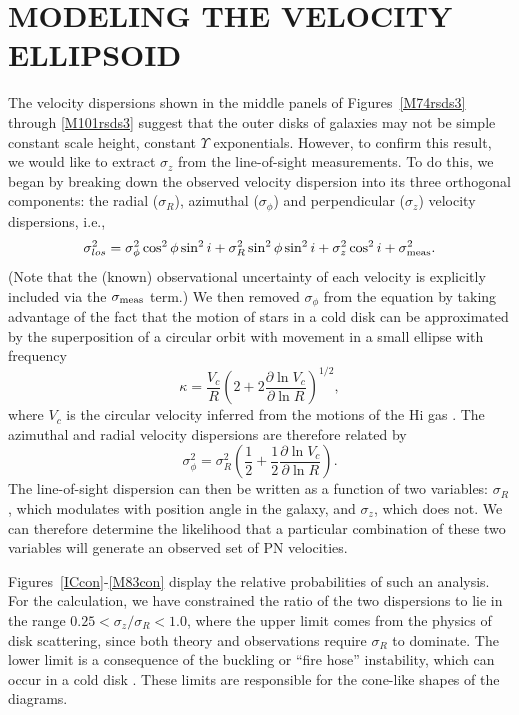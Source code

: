 \documentclass[12pt,preprint]{emulateapj}
\newcommand{\ie}{{i.e.,}}
\begin{document}
\section{MODELING THE VELOCITY ELLIPSOID}

The velocity dispersions shown in the middle panels of Figures~\ref{M74rsds3} through \ref{M101rsds3} suggest that the outer disks of galaxies may not be simple constant scale height, constant $\Upsilon$ exponentials.  However, to confirm this result, we would like to extract $\sigma_z$ from the line-of-sight measurements.  To do this, we began by breaking down the observed velocity dispersion into its three orthogonal components: the radial ($\sigma_R$), azimuthal ($\sigma_{\phi}$) and perpendicular ($\sigma_z$) velocity dispersions, \ie
\begin{equation}
\sigma^2_{los} = \sigma^2_{\phi} \cos^2 \phi \sin^2 i + \sigma^2_R \sin^2 \phi \sin^2 i + \sigma^2_z \cos^2 i + \sigma^2_{\rm meas}.\label{siglos_eq}
\end{equation}
(Note that the (known) observational uncertainty of each velocity is explicitly included via the $\sigma_{\rm meas}$ term.)  We then removed $\sigma_{\phi}$ from the equation by taking advantage of the fact that the motion of stars in a cold disk can be approximated by the superposition of a circular orbit with movement in a small ellipse with frequency
\begin{equation}
\kappa = \frac{V_c}{R} \left( 2 + 2\frac{\partial \ln V_c}{\partial \ln R} \right)^{1/2},
\label{kappa}
\end{equation}
where $V_c$ is the circular velocity inferred from the motions of the H{\sc i} gas \citep{bt87}.   The azimuthal and radial velocity dispersions are therefore related by
\begin{equation}
\sigma^2_{\phi} = \sigma^2_R \left( \frac{1}{2} + \frac{1}{2} \frac{\partial \ln V_c}{\partial \ln R} \right).
\label{epicyclic}
\end{equation}
The line-of-sight dispersion can then be written as a function of two variables: $\sigma_R$, which modulates with position angle in the galaxy, and $\sigma_z$, which does not.  We can therefore determine the likelihood that a particular combination of these two variables will generate an observed set of PN velocities.

Figures~\ref{ICcon}-\ref{M83con} display the relative probabilities of such an analysis.  For the calculation, we have constrained the ratio of the two dispersions to lie in the range $0.25 < \sigma_z / \sigma_R < 1.0$, where the upper limit comes from the physics of disk scattering, since both theory \citep{v85, jb90} and observations \citep{b99, g+97, g+00} require $\sigma_R$ to dominate.  The lower limit is a consequence of the buckling or ``fire hose'' instability, which can occur in a cold disk \citep{t66, a85, ms94}.  These limits are responsible for the cone-like shapes of the diagrams.
\end{document}
